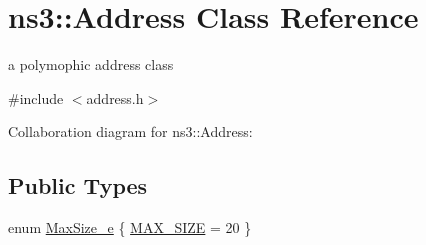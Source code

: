 \hypertarget{classns3_1_1Address}{}\section{ns3\+:\+:Address Class Reference}
\label{classns3_1_1Address}


a polymophic address class  




{\ttfamily \#include $<$address.\+h$>$}



Collaboration diagram for ns3\+:\+:Address\+:
\subsection*{Public Types}
\begin{DoxyCompactItemize}
\item 
enum \hyperlink{classns3_1_1Address_a34cb50781c65195ba10651d82d084b4f}{Max\+Size\+\_\+e} \{ \hyperlink{classns3_1_1Address_a34cb50781c65195ba10651d82d084b4fae450cf1a7cb3df8a05d29b23aecf7f84}{M\+A\+X\+\_\+\+S\+I\+ZE} = 20
 \}
\end{DoxyCompactItemize}
